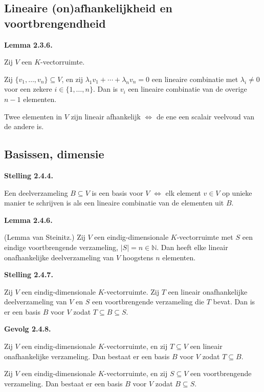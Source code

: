 \documentclass[10pt,a4paper]{article}
\newenvironment{res}[2]{%
  \par\noindent\textbf{#1 #2.}%
}{%
  \par\vspace{2pt}\normalfont
}
\begin{document}
\subsection{Lineaire (on)afhankelijkheid en voortbrengendheid}
\begin{res}{Lemma}{2.3.6}
Zij $V$ een $K$-vectorruimte.
\begin{myenum}
\item Zij $\{v_1,\dots,v_n\}\subseteq V$, en zij $\lambda_1v_1+\cdots+\lambda_nv_n=0$ een lineaire combinatie met $\lambda_i\ne0$ voor een zekere $i\in\{1,\dots,n\}$. Dan is $v_i$ een lineaire combinatie van de overige $n-1$ elementen.
\item Twee elementen in $V$ zijn lineair afhankelijk \(\iff\) de ene een scalair veelvoud van de andere is.
\end{myenum}
\end{res}

\subsection{Basissen, dimensie}
\begin{res}{Stelling}{2.4.4}
Een deelverzameling $B\subseteq V$ is een basis voor $V$ \(\iff\) elk element $v\in V$ op unieke manier te schrijven is als een lineaire combinatie van de elementen uit $B$.
\end{res}

\begin{res}{Lemma}{2.4.6}
\textup{(Lemma van Steinitz.)} Zij $V$ een eindig-dimensionale $K$-vectorruimte met $S$ een eindige voortbrengende verzameling, $|S|=n\in\mathbb N$. Dan heeft elke lineair onafhankelijke deelverzameling van $V$ hoogstens $n$ elementen.
\end{res}

\begin{res}{Stelling}{2.4.7}
Zij $V$ een eindig-dimensionale $K$-vectorruimte. Zij $T$ een lineair onafhankelijke deelverzameling van $V$ en $S$ een voortbrengende verzameling die $T$ bevat. Dan is er een basis $B$ voor $V$ zodat $T\subseteq B\subseteq S$.
\end{res}

\begin{res}{Gevolg}{2.4.8}
\begin{myenum}
\item Zij $V$ een eindig-dimensionale $K$-vectorruimte, en zij $T\subseteq V$ een lineair onafhankelijke verzameling. Dan bestaat er een basis $B$ voor $V$ zodat $T\subseteq B$.
\item Zij $V$ een eindig-dimensionale $K$-vectorruimte, en zij $S\subseteq V$ een voortbrengende verzameling. Dan bestaat er een basis $B$ voor $V$ zodat $B\subseteq S$.
\end{myenum}
\end{res}
\end{document}
